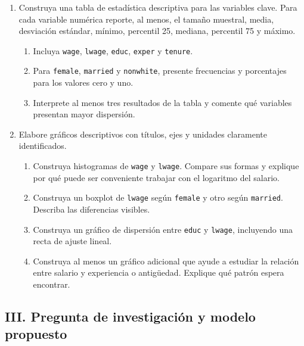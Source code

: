 \documentclass[letterpaper,11pt]{article}
\begin{document}
\begin{enumerate}[resume]

\item Construya una tabla de estadística descriptiva para las variables clave.
    Para cada variable numérica reporte, al menos, el tamaño muestral, media,
    desviación estándar, mínimo, percentil 25, mediana, percentil 75 y máximo.
    \begin{enumerate}[label=(\alph*)]
        \item Incluya \texttt{wage}, \texttt{lwage}, \texttt{educ},
              \texttt{exper} y \texttt{tenure}.
        \item Para \texttt{female}, \texttt{married} y \texttt{nonwhite},
              presente frecuencias y porcentajes para los valores cero y uno.
        \item Interprete al menos tres resultados de la tabla y comente qué
              variables presentan mayor dispersión.
    \end{enumerate}

\item Elabore gráficos descriptivos con títulos, ejes y unidades claramente
    identificados.
    \begin{enumerate}[label=(\alph*)]
        \item Construya histogramas de \texttt{wage} y \texttt{lwage}. Compare
              sus formas y explique por qué puede ser conveniente trabajar con
              el logaritmo del salario.
        \item Construya un boxplot de \texttt{lwage} según \texttt{female} y
              otro según \texttt{married}. Describa las diferencias visibles.
        \item Construya un gráfico de dispersión entre \texttt{educ} y
              \texttt{lwage}, incluyendo una recta de ajuste lineal.
        \item Construya al menos un gráfico adicional que ayude a estudiar la
              relación entre salario y experiencia o antigüedad. Explique qué
              patrón espera encontrar.
    \end{enumerate}

\end{enumerate}

\subsection*{III. Pregunta de investigación y modelo propuesto}
\end{document}

